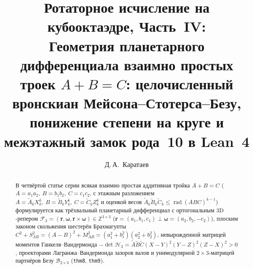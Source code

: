 \documentclass[11pt,a4paper]{article}
\title{\textbf{Ротаторное исчисление на кубооктаэдре, Часть~IV:\\ Геометрия планетарного дифференциала взаимно простых троек $A + B = C$: целочисленный вронскиан Мейсона--Стотерса--Безу, понижение степени на круге и межэтажный замок рода~10 в Lean~4}}
\author{Д.\,А.~Каратаев}
\date{}
\theoremstyle{plain}
\theoremstyle{definition}
\begin{document}
\maketitle

\begin{abstract}
В четвёртой статье серии всякая взаимно простая аддитивная тройка $A + B = C$ ($A = a_1 a_2,\ B = b_1 b_2,\ C = c_1 c_2$, с этажным разложением $A = \widetilde{A}_k X_k^k,\ B = \widetilde{B}_k Y_k^k,\ C = \widetilde{C}_k Z_k^k$ и оценкой весов $\widetilde{A}_k\widetilde{B}_k\widetilde{C}_k \le \operatorname{rad}(ABC)^{k-1}$) формулируется как трёхвальный планетарный дифференциал с ортогональным $3\mathrm{D}$-репером $\mathcal{F}_3 = (\mathbf{r},\mathbf{\omega},\mathbf{r}\times\mathbf{\omega})\in\mathbb{Z}^{3\times 3}$ ($\mathbf{r} = (a_1,b_1,c_1)\perp\mathbf{\omega} = (a_2,b_2,-c_2)$), плоским законом скольжения шестерён Брахмагупты $C^2 + S_{AB}^2 = (A-B)^2 + M_{AB}^2 = (a_1^2+b_1^2)(a_2^2+b_2^2)$, невырожденной матрицей моментов Ганкеля--Вандермонда $-\det\mathcal{H}_3 = \widetilde{A}\widetilde{B}\widetilde{C}(X-Y)^2(Y-Z)^2(Z-X)^2 > 0$, проекторами Лагранжа--Вандермонда зазоров валов и унимодулярной $2\times 3$-матрицей партнёров Безу $\mathcal{B}_{2\times 3}$ (\texttt{thm8}, \texttt{thm9}).


\end{abstract}
\end{document}
